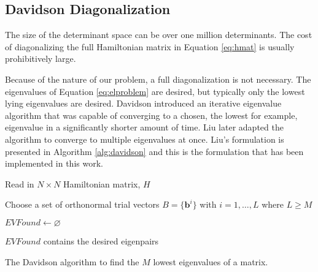 \documentclass[final,3p,times,twocolumn]{elsarticle}
\begin{document}
\subsection{Davidson Diagonalization} \label{sec:davidson}
The size of the determinant space can be over one million determinants. The cost of diagonalizing the full Hamiltonian matrix in Equation \eqref{eq:hmat} is usually prohibitively large. %

Because of the nature of our problem, a full diagonalization is not necessary. The eigenvalues of Equation \eqref{eq:elproblem} are desired, but typically only the lowest lying eigenvalues are desired. Davidson introduced an iterative eigenvalue algorithm that was capable of converging to a chosen, the lowest for example, eigenvalue in a significantly shorter amount of time.\cite{davidson} Liu later adapted the algorithm to converge to multiple eigenvalues at once.\cite{liu} Liu's formulation is presented in Algorithm \ref{alg:davidson} and this is the formulation that has been implemented in this work.

\begin{algorithm}
 Read in $N \times N$ Hamiltonian matrix, $H$\;
 
 Choose a set of orthonormal trial vectors $B = \{\mathbf{b}^i\}$ with $i = 1,  \ldots, L$ where $L \geq M$\;
 
 $EVFound \leftarrow \varnothing $\;
 
 $EVFound$ contains the desired eigenpairs\;

\caption{The Davidson algorithm to find the $M$ lowest eigenvalues of a matrix.} 
\label{alg:davidson}
\end{algorithm}
\end{document}
